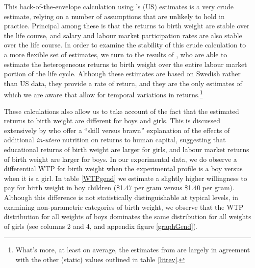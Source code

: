 \documentclass[a4paper, 11pt]{article}
\begin{document}
\begin{spacing}{1.4}
This back-of-the-envelope calculation using
\citet{BehrmanRosenzweig2004}'s (US) estimates is a very crude estimate, 
relying on a number of assumptions that are unlikely to hold in
practice.  Principal among these is that the returns to birth weight
are stable over the life course, and salary and labour market participation
rates are also stable over the life course.  In order to examine the
stability of this crude calculation to a more flexible set of estimates,
we turn to the results of \citet{Bharadwajetal2015}, who are able to estimate
the heterogeneous returns to birth weight over the entire labour market
portion of the life cycle. Although these estimates are based on Swedish
rather than US data, they provide a rate of return, and they are the only
estimates of which we are aware that allow for temporal variations
in returns.\footnote{What's more, at least on average, the estimates
  from \citet{Bharadwajetal2015} are largely in agreement with the
  other (static) values outlined in table \ref{litrev}.}

These calculations also allow us to take account of the fact that
the estimated returns to birth weight are different for boys and
girls.  This is discussed extensively by \citet{RosenzweigZhang2013}
who offer a ``skill versus brawn'' explanation of the effects of
additional \emph{in-utero} nutrition on returns to human capital,
suggesting that educational returns of birth weight are larger for
girls, and labour market returns of birth weight are larger for boys.
In our experimental data, we do observe a differential WTP for birth weight
when the experimental profile is a boy versus when it is a girl. In
table \ref{WTPgend} we estimate a slightly higher willingness to pay
for birth weight in boy children (\$1.47 per gram versus \$1.40 per gram).
Although this difference is not statistically distinguishable at typical
levels, in examining non-parametric categories of birth weight, we
observe that the WTP distribution for all weights of boys dominates
the same distribution for all weights of girls (see columns 2 and 4,
and appendix figure \ref{graphGend}).


\end{spacing}
\end{document}
